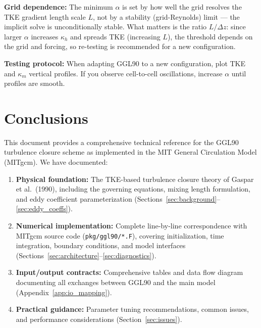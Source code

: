 \documentclass[12pt,letterpaper]{article}
\begin{document}
\textbf{Grid dependence:} The minimum $\alpha$ is set by how well the grid resolves the TKE gradient length scale $L$, not by a stability (grid-Reynolds) limit --- the implicit solve is unconditionally stable. What matters is the ratio $L/\Delta z$: since larger $\alpha$ increases $\kappa_h$ and spreads TKE (increasing $L$), the threshold depends on the grid and forcing, so re-testing is recommended for a new configuration.

\textbf{Testing protocol:} When adapting GGL90 to a new configuration, plot TKE and $\kappa_m$ vertical profiles. If you observe cell-to-cell oscillations, increase $\alpha$ until profiles are smooth.

\section{Conclusions}
\label{sec:conclusions}

This document provides a comprehensive technical reference for the GGL90 turbulence closure scheme as implemented in the MIT General Circulation Model (MITgcm). We have documented:

\begin{enumerate}
\item \textbf{Physical foundation:} The TKE-based turbulence closure theory of Gaspar et al.\ (1990), including the governing equations, mixing length formulation, and eddy coefficient parameterization (Sections~\ref{sec:background}--\ref{sec:eddy_coeffs}).

\item \textbf{Numerical implementation:} Complete line-by-line correspondence with MITgcm source code (\verb|pkg/ggl90/*.F|), covering initialization, time integration, boundary conditions, and model interfaces (Sections~\ref{sec:architecture}--\ref{sec:diagnostics}).

\item \textbf{Input/output contracts:} Comprehensive tables and data flow diagram documenting all exchanges between GGL90 and the main model (Appendix~\ref{app:io_mapping}).

\item \textbf{Practical guidance:} Parameter tuning recommendations, common issues, and performance considerations (Section~\ref{sec:issues}).
\end{enumerate}
\end{document}
